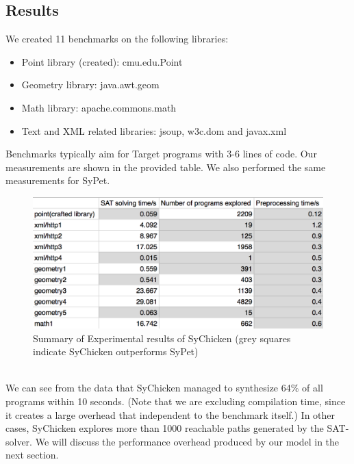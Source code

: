 \documentclass[twocolumn]{article}
\begin{document}
\subsection{Results}
We created 11 benchmarks on the following libraries:
\begin{itemize}
    \item Point library (created): cmu.edu.Point
    \item Geometry library: java.awt.geom
    \item Math library: apache.commons.math
    \item Text and XML related libraries: jsoup, w3c.dom and javax.xml
\end{itemize}
Benchmarks typically aim for Target programs with 3-6 lines of code. Our measurements are shown in the provided table. We also performed the same measurements for SyPet.\\
\begin{figure}[h]
  \includegraphics[width = \linewidth]{data1.png}
\caption{Summary of Experimental results of SyChicken (grey squares indicate SyChicken outperforms SyPet)}
\end{figure}\\
We can see from the data that SyChicken managed to synthesize 64\% of all programs within 10 seconds. (Note that we are excluding compilation time, since it creates a large overhead that independent to the benchmark itself.) In other cases, SyChicken explores more than 1000 reachable paths generated by the SAT-solver. We will discuss the performance overhead produced by our model in the next section.\\
\end{document}
